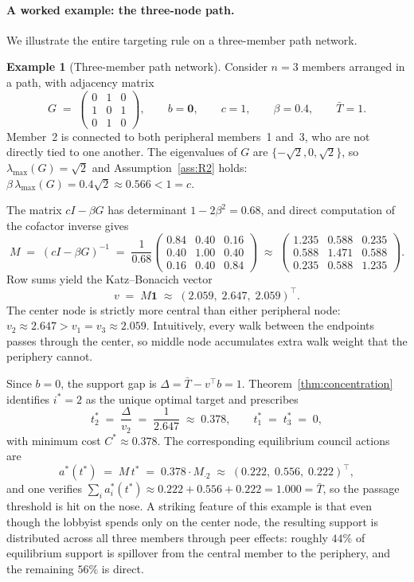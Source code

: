 \documentclass[11pt,letterpaper]{article}
\theoremstyle{plain}
\theoremstyle{definition}
\newtheorem{example}{Example}
\theoremstyle{remark}
\begin{document}
\paragraph{A worked example: the three-node path.} We illustrate the entire targeting rule on a three-member path network.

\begin{example}[Three-member path network]\label{ex:3path}
Consider $n = 3$ members arranged in a path, with adjacency matrix
\[
G \;=\; \begin{pmatrix} 0 & 1 & 0 \\ 1 & 0 & 1 \\ 0 & 1 & 0 \end{pmatrix}, \qquad b = \mathbf{0}, \qquad c = 1, \qquad \beta = 0.4, \qquad \bar T = 1.
\]
Member~2 is connected to both peripheral members~1 and~3, who are not directly tied to one another. The eigenvalues of $G$ are $\{-\sqrt{2}, 0, \sqrt{2}\}$, so $\lambda_{\max}(G) = \sqrt{2}$ and Assumption~\ref{ass:R2} holds: $\beta\,\lambda_{\max}(G) = 0.4\sqrt{2} \approx 0.566 < 1 = c$. \end{example}

The matrix $cI - \beta G$ has determinant $1 - 2\beta^2 = 0.68$, and direct computation of the cofactor inverse gives
\[
M \;=\; (cI - \beta G)^{-1} \;=\; \frac{1}{0.68}\begin{pmatrix} 0.84 & 0.40 & 0.16 \\ 0.40 & 1.00 & 0.40 \\ 0.16 & 0.40 & 0.84 \end{pmatrix}
\;\approx\;
\begin{pmatrix} 1.235 & 0.588 & 0.235 \\ 0.588 & 1.471 & 0.588 \\ 0.235 & 0.588 & 1.235 \end{pmatrix}.
\]
Row sums yield the Katz--Bonacich vector
\[
v \;=\; M\mathbf{1} \;\approx\; (2.059,\; 2.647,\; 2.059)^\top.
\]
The center node is strictly more central than either peripheral node: $v_2 \approx 2.647 > v_1 = v_3 \approx 2.059$. Intuitively, every walk between the endpoints passes through the center, so middle node accumulates extra walk weight that the periphery cannot.

Since $b = 0$, the support gap is $\Delta = \bar T - v^\top b = 1$. Theorem~\ref{thm:concentration} identifies $i^* = 2$ as the unique optimal target and prescribes
\[
t^*_2 \;=\; \frac{\Delta}{v_2} \;=\; \frac{1}{2.647} \;\approx\; 0.378, \qquad t^*_1 \;=\; t^*_3 \;=\; 0,
\]
with minimum cost $C^* \approx 0.378$. The corresponding equilibrium council actions are
\[
a^*(t^*) \;=\; M\,t^* \;=\; 0.378 \cdot M_{\cdot 2} \;\approx\; (0.222,\; 0.556,\; 0.222)^\top,
\]
and one verifies $\sum_i a_i^*(t^*) \approx 0.222 + 0.556 + 0.222 = 1.000 = \bar T$, so the passage threshold is hit on the nose. A striking feature of this example is that even though the lobbyist spends only on the center node, the resulting support is distributed across all three members through peer effects: roughly $44\%$ of equilibrium support is spillover from the central member to the periphery, and the remaining $56\%$ is direct.
\end{document}
